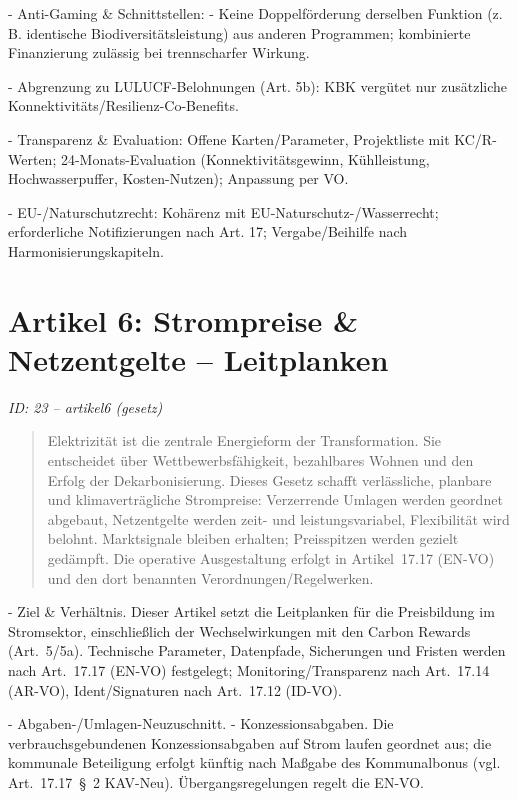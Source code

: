 \documentclass[12pt,a4paper]{scrartcl}
\begin{document}
- Anti-Gaming \& Schnittstellen:
- Keine Doppelförderung derselben Funktion (z. B. identische Biodiversitätsleistung) aus anderen Programmen; kombinierte Finanzierung zulässig bei trennscharfer Wirkung.

- Abgrenzung zu LULUCF-Belohnungen (Art. 5b): KBK vergütet nur zusätzliche Konnektivitäts/Resilienz-Co-Benefits.

- Transparenz \& Evaluation: Offene Karten/Parameter, Projektliste mit KC/R-Werten; 24-Monats-Evaluation (Konnektivitätsgewinn, Kühlleistung, Hochwasserpuffer, Kosten-Nutzen); Anpassung per VO.

- EU-/Naturschutzrecht: Kohärenz mit EU-Naturschutz-/Wasserrecht; erforderliche Notifizierungen nach Art. 17; Vergabe/Beihilfe nach Harmonisierungskapiteln.


\section[Artikel 6: Strompreise \& Netzentgelte -- Leitplanken]{Artikel 6: Strompreise \& Netzentgelte -- Leitplanken}
\noindent\textit{ID: 23 -- artikel6 (gesetz)}

\begin{quote}
Elektrizität ist die zentrale Energieform der Transformation. Sie entscheidet über Wettbewerbsfähigkeit, bezahlbares Wohnen und den Erfolg der Dekarbonisierung. Dieses Gesetz schafft verlässliche, planbare und klimaverträgliche Strompreise: Verzerrende Umlagen werden geordnet abgebaut, Netzentgelte werden zeit- und leistungsvariabel, Flexibilität wird belohnt. Marktsignale bleiben erhalten; Preisspitzen werden gezielt gedämpft. Die operative Ausgestaltung erfolgt in Artikel 17.17 (EN-VO) und den dort benannten Verordnungen/Regelwerken.
\end{quote}

- Ziel \& Verhältnis. Dieser Artikel setzt die Leitplanken für die Preisbildung im Stromsektor, einschließlich der Wechselwirkungen mit den Carbon Rewards (Art. 5/5a). Technische Parameter, Datenpfade, Sicherungen und Fristen werden nach Art. 17.17 (EN-VO) festgelegt; Monitoring/Transparenz nach Art. 17.14 (AR-VO), Ident/Signaturen nach Art. 17.12 (ID-VO).

- Abgaben-/Umlagen-Neuzuschnitt.
- Konzessionsabgaben. Die verbrauchsgebundenen Konzessionsabgaben auf Strom laufen geordnet aus; die kommunale Beteiligung erfolgt künftig nach Maßgabe des Kommunalbonus (vgl. Art. 17.17 § 2 KAV-Neu). Übergangsregelungen regelt die EN-VO.
\end{document}
